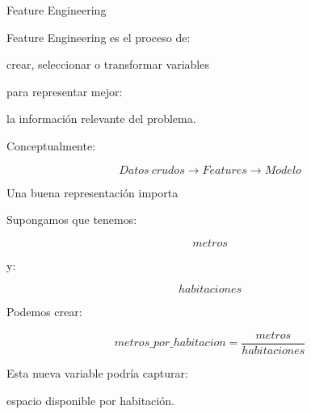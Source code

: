 \documentclass[aspectratio=169,11pt]{beamer}
\begin{document}

\begin{frame}{Feature Engineering}

Feature Engineering es el proceso de:

\begin{center}

\Large
crear, seleccionar o transformar variables
\end{center}

para representar mejor:

\begin{center}

\Large
la información relevante del problema.
\end{center}

\vspace{0.4cm}

Conceptualmente:

\[
\boxed{
Datos\ crudos
\rightarrow
Features
\rightarrow
Modelo
}
\]

\end{frame}


\begin{frame}{Una buena representación importa}

Supongamos que tenemos:

\[
metros
\]

y:

\[
habitaciones
\]

Podemos crear:

\[
\boxed{
metros\_por\_habitacion
=
\frac{
metros
}{
habitaciones
}
}
\]

Esta nueva variable podría capturar:

\begin{center}

\Large
espacio disponible por habitación.
\end{center}

\end{frame}

\end{document}
